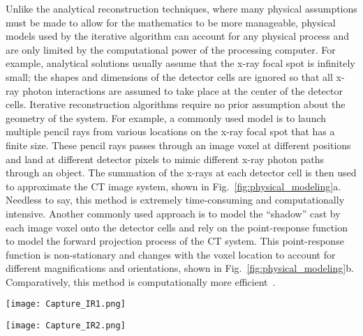 Unlike the analytical reconstruction techniques, where many physical assumptions must be made to allow for the mathematics to be more manageable, physical models used by the iterative algorithm can account for any physical process and are only limited by the computational power of the processing computer.  For example, analytical solutions usually assume that the x-ray focal spot is infinitely small; the shapes and dimensions of the detector cells are ignored so that all x-ray photon interactions are assumed to take place at the center of the detector cells.  Iterative reconstruction algorithms require no prior assumption about the geometry of the system.  For example, a commonly used model is to launch multiple pencil rays from various locations on the x-ray focal spot that has a finite size.  These pencil rays passes through an image voxel at different positions and land at different detector pixels to mimic different x-ray photon paths through an object.  The summation of the x-rays at each detector cell is then used to approximate the CT image system, shown in Fig.~\ref{fig:physical_modeling}a. Needless to say, this method is extremely time-consuming and computationally intensive.  Another commonly used approach is to model the ``shadow'' cast by each image voxel onto the detector cells and rely on the point-response function to model the forward projection process of the CT system.  This point-response function is non-stationary and changes with the voxel location to account for different magnifications and orientations, shown in Fig.~\ref{fig:physical_modeling}b.  Comparatively, this method is computationally more efficient~\citep{Hsieh2013}.


\begin{figure*}
	\begin{minipage}{0.4\linewidth}
	\texttt{[image: Capture\_IR1.png]}
	\subcaption{}
	\end{minipage}
	\begin{minipage}{0.4\linewidth}
	\texttt{[image: Capture\_IR2.png]}
	\subcaption{}
	\end{minipage}
\caption[]{Common physical models used for the iterative reconstruction algorithm\footnotemark. (a) The pencil beam model; and (b) the point-response model.}
\label{fig:physical_modeling}
\end{figure*}



